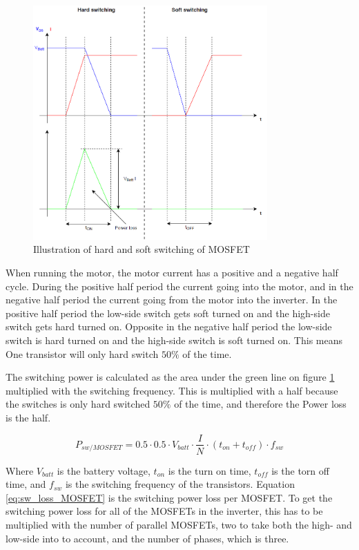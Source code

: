     \begin{figure}[H]
		\centering
		\includegraphics[width=0.8\textwidth]{pictures/hardware/Power_Board/Hard_soft_switching.PNG}
		\caption{Illustration of hard and soft switching of MOSFET}
		\label{fig:HardSoftSwitch}
	\end{figure} 

When running the motor, the motor current has a positive and a negative half cycle. During the positive half period the current going into the motor, and in the negative half period the current going from the motor into the inverter. In the positive half period the low-side switch gets soft turned on and the high-side switch gets hard turned on. Opposite in the negative half period the low-side switch is hard turned on and the high-side switch is soft turned on. This means One transistor will only hard switch $50 \%$ of the time.

The switching power is calculated as the area under the green line on figure \ref{fig:HardSoftSwitch} multiplied with the switching frequency. This is multiplied with a half because the switches is only hard switched $50 \%$ of the time, and therefore the Power loss is the half. 

    \begin{equation}
        P_{sw/MOSFET} = 0.5 \cdot 0.5 \cdot V_{batt} \cdot \frac{I}{N} \cdot (t_{on}+t_{off}) \cdot f_{sw}
        \label{eq:sw_loss_MOSFET}
    \end{equation}

Where $V_{batt}$ is the battery voltage, $t_{on}$ is the turn on time, $t_{off}$ is the torn off time, and $f_{sw}$ is the switching frequency of the transistors.
Equation \ref{eq:sw_loss_MOSFET} is the switching power loss per MOSFET. To get the switching power loss for all of the MOSFETs in the inverter, this has to be multiplied with the number of parallel MOSFETs, two to take both the high- and low-side into to account, and the number of phases, which is three.


